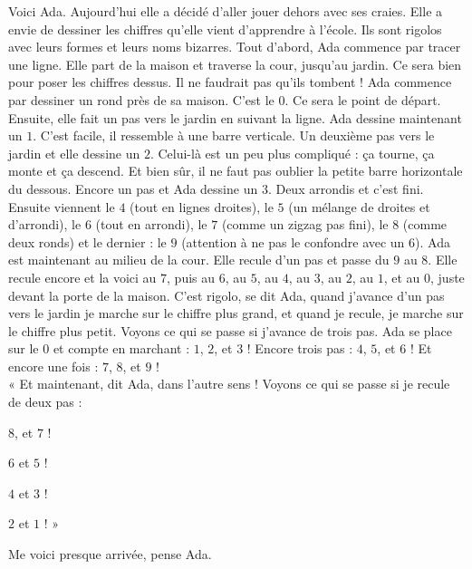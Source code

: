 Voici Ada. Aujourd'hui elle a décidé d'aller jouer dehors avec ses craies. 
Elle a envie de dessiner les chiffres qu'elle vient d'apprendre à l'école. Ils sont rigolos avec leurs formes et leurs noms bizarres.
Tout d'abord, Ada commence par tracer une ligne. Elle part de la maison et traverse la cour, jusqu'au jardin. 
Ce sera bien pour poser les chiffres dessus. Il ne faudrait pas qu'ils tombent ! 
Ada commence par dessiner un rond près de sa maison. C'est le $0$. Ce sera le point de départ. 
Ensuite, elle fait un pas vers le jardin en suivant la ligne. Ada dessine maintenant un $1$. C'est facile, il ressemble à une barre verticale. 
Un deuxième pas vers le jardin et elle dessine un $2$. Celui-là est un peu plus compliqué : ça tourne, ça monte et ça descend. Et bien sûr, il ne faut pas oublier la petite barre horizontale du dessous.
Encore un pas et Ada dessine un $3$. Deux arrondis et c'est fini.
Ensuite viennent le $4$ (tout en lignes droites), le $5$ (un mélange de droites et d'arrondi), le $6$ (tout en arrondi), le $7$ (comme un zigzag pas fini), le $8$ (comme deux ronds) et le dernier : le $9$ (attention à ne pas le confondre avec un $6$). 
Ada est maintenant au milieu de la cour. Elle recule d'un pas et passe du $9$ au $8$. Elle recule encore et la voici au $7$, puis au $6$, au $5$, au $4$, au $3$, au $2$, au $1$, et au $0$, juste devant la porte de la maison. 
C'est rigolo, se dit Ada, quand j'avance d'un pas vers le jardin je marche sur le chiffre plus grand, et quand je recule, je marche sur le chiffre plus petit. 
Voyons ce qui se passe si j'avance de trois pas. Ada se place sur le $0$ et compte en marchant : $1$, $2$, et $3$ ! Encore trois pas : $4$, $5$, et $6$ ! Et encore une fois : $7$, $8$, et $9$ ! \\
« Et maintenant, dit Ada, dans l'autre sens ! Voyons ce qui se passe si je recule de deux pas : 
\begin{description}
    \item $8$, et $7$ ! 
    \item $6$ et $5$ ! 
    \item $4$ et $3$ ! 
    \item $2$ et $1$ ! »
\end{description} 
Me voici presque arrivée, pense Ada.


%    
